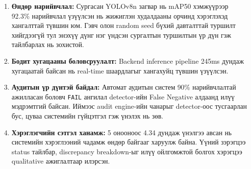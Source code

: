 \begin{enumerate}
\item \textbf{Өндөр нарийвчлал:} Сургасан YOLOv8n загвар нь mAP50 хэмжүүрээр 92.3\% нарийвчлал үзүүлсэн нь жижиглэн худалдааны орчинд хэрэглэхэд хангалттай түвшин юм. Гэвч олон random seed бүхий давталттай туршилт хийгдээгүй тул энэхүү дүнг нэг үндсэн сургалтын туршилтын үр дүн гэж тайлбарлах нь зохистой.
\item \textbf{Бодит хугацааны боловсруулалт:} Backend inference pipeline 245ms дундаж хугацаатай байсан нь real-time шаардлагыг хангахуйц түвшин үзүүлсэн.
\item \textbf{Аудитын үр дүнтэй байдал:} Автомат аудитын систем 90\% нарийвчлалтай ажилласан боловч \texttt{FAIL} ангилал detector-ийн False Negative алдаанд илүү мэдрэмтгий байсан. Иймээс audit engine-ийн чанарыг detector-оос тусгаарлан бус, цуваа системийн гүйцэтгэл гэж үнэлэх нь зөв.
\item \textbf{Хэрэглэгчийн сэтгэл ханамж:} 5 онооноос 4.34 дундаж үнэлгээ авсан нь системийн хэрэглээний чадамж өндөр байгааг харуулж байна. Үүний зэрэгцээ status тайлбар, discrepancy breakdown-ыг илүү ойлгомжтой болгох хэрэгцээ qualitative ажиглалтаар илэрсэн.
\end{enumerate}
